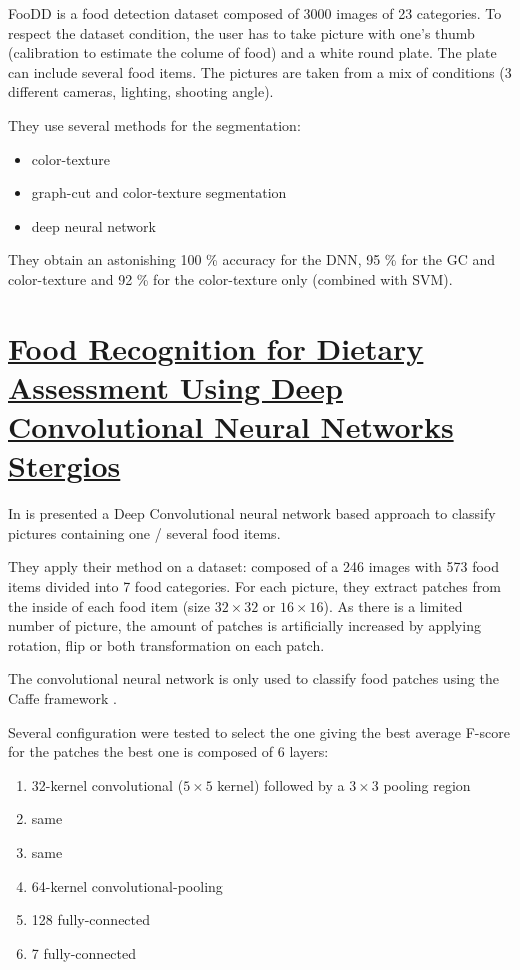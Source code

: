 FooDD is a food detection dataset composed of 3000 images of 23 categories. To respect the dataset condition, the user has to take picture with one's thumb (calibration to estimate the colume of food) and a white round plate. The plate can include several food items. The pictures are taken from a mix of conditions (3 different cameras, lighting, shooting angle).

They use several methods for the segmentation:
\begin{itemize}
    \item color-texture 
    \item graph-cut and color-texture segmentation
    \item deep neural network
\end{itemize}

They obtain an astonishing 100 \% accuracy for the DNN, 95 \% for the GC and color-texture and 92 \% for the color-texture only (combined with SVM).

\section{\href{http://link.springer.com/10.1007/978-3-319-23222-5_56}{Food Recognition for Dietary Assessment Using Deep Convolutional Neural Networks Stergios}}

In \cite{Christodoulidis2015} is presented a Deep Convolutional neural network based approach to classify pictures containing one / several food items.

They apply their method on a dataset: composed of a 246 images with 573 food items divided into 7 food categories. For each picture, they extract patches from the inside of each food item (size $32 \times 32$ or $16 \times 16$). As there is a limited number of picture, the amount of patches is artificially increased by applying rotation, flip or both transformation on each patch.


The convolutional neural network is only used to classify food patches using the Caffe framework \cite{jia2014caffe}.

Several configuration were tested to select the one giving the best average F-score for the patches
the best one is composed of 6 layers:
\begin{enumerate}
    \item 32-kernel convolutional ($5 \times 5$ kernel) followed by a $3 \times 3$ pooling region
    \item same
    \item same
    \item 64-kernel convolutional-pooling
    \item 128 fully-connected
    \item 7 fully-connected
\end{enumerate}

